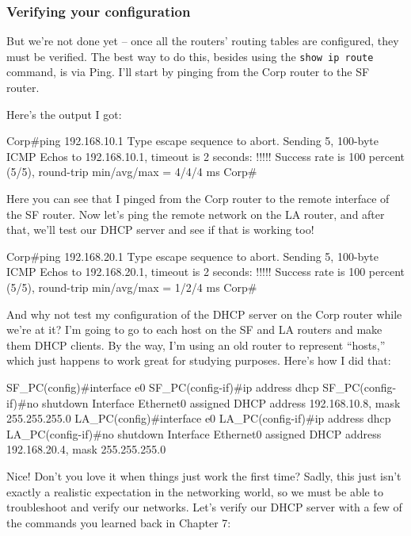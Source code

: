 \subsubsection{Verifying your configuration}

But we're not done yet -- once all the routers' routing tables are
configured, they must be verified. The best way to do this, besides
using the \texttt{show\ ip\ route} command, is via Ping. I'll start by
pinging from the Corp router to the SF router.

Here's the output I got:

\begin{cli}
Corp#ping 192.168.10.1
Type escape sequence to abort.
Sending 5, 100-byte ICMP Echos to 192.168.10.1, timeout is 2 seconds:
!!!!!
Success rate is 100 percent (5/5), round-trip min/avg/max = 4/4/4 ms
Corp#
\end{cli}

Here you can see that I pinged from the Corp router to the remote
interface of the SF router. Now let's ping the remote network on the LA
router, and after that, we'll test our DHCP server and see if that is
working too!

\begin{cli}
Corp#ping 192.168.20.1
Type escape sequence to abort.
Sending 5, 100-byte ICMP Echos to 192.168.20.1, timeout is 2 seconds:
!!!!!
Success rate is 100 percent (5/5), round-trip min/avg/max = 1/2/4 ms
Corp#
\end{cli}

And why not test my configuration of the DHCP server on the Corp router while we're at it?
I'm going to go to each host on the SF and LA routers and make them DHCP clients.
By the way, I'm using an old router to represent ``hosts,'' which just happens to work great for studying purposes.
Here's how I did that:

\begin{cli}
SF_PC(config)#interface e0
SF_PC(config-if)#ip address dhcp
SF_PC(config-if)#no shutdown
Interface Ethernet0 assigned DHCP address 192.168.10.8, mask 255.255.255.0
LA_PC(config)#interface e0
LA_PC(config-if)#ip address dhcp
LA_PC(config-if)#no shutdown
Interface Ethernet0 assigned DHCP address 192.168.20.4, mask 255.255.255.0
\end{cli}

Nice! Don't you love it when things just work the first time? Sadly,
this just isn't exactly a realistic expectation in the networking world,
so we must be able to troubleshoot and verify our networks. Let's verify
our DHCP server with a few of the commands you learned back in Chapter
7:


